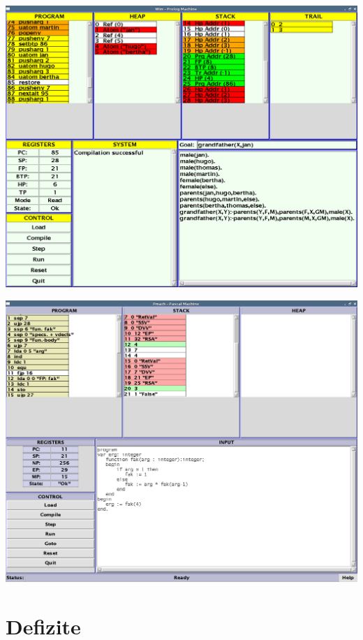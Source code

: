 \documentclass{beamer}
\begin{document}
\begin{frame}[plain]
	\centering
	\includegraphics[width=\textwidth]{screenshot_old_wim.png}
\end{frame}

\begin{frame}[plain]
	\centering
	\includegraphics[width=\textwidth]{screenshot_old_pmach.png}
\end{frame}

\section{Defizite}
\end{document}
